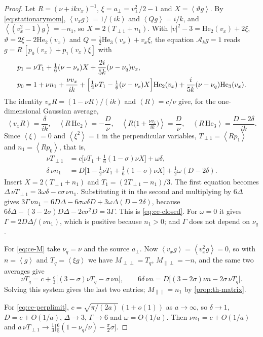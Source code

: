 \documentclass[11pt]{article}
\newcommand{\av}[1]{\left\langle #1\right\rangle}
\newcommand{\A}{\mathcal A}
\newcommand{\He}{\mathrm{He}}
\theoremstyle{definition}
\theoremstyle{remark}
\numberwithin{equation}{section}
\begin{document}
\begin{proof}
Let $R=(\nu+ikv_x)^{-1}$, $\xi=a_\perp=v_\perp^2/2-1$ and
$X=\av{\vartheta g}$. By \eqref{eq:stationarymom},
$\av{v_xg}=1/(ik)$ and $\av{Qg}=i/k$, and
$\av{(v_x^2-1)g}=-n_1$, so $X=2(T_{\perp1}+n_1)$. With
$|v|^2-3=\He_2(v_x)+2\xi$, $\vartheta=2\xi-2\He_2(v_x)$ and
$Q=\tfrac12\He_3(v_x)+v_x\xi$, the equation $\A_kg=1$ reads
$g=R\,[p_0(v_x)+p_1(v_x)\xi]$ with
\begin{align*}
 p_1&=\nu T_1+\tfrac16(\nu-\nu_s)X+\frac{2i}{5k}(\nu-\nu_q)v_x,\\
 p_0&=1+\nu n_1+\frac{\nu v_x}{ik}
     +\Bigl[\tfrac12\nu T_1-\tfrac16(\nu-\nu_s)X\Bigr]\He_2(v_x)
     +\frac{i}{5k}(\nu-\nu_q)\He_3(v_x).
\end{align*}
The identity $v_xR=(1-\nu R)/(ik)$ and $\av R=c/\nu$ give, for the
one-dimensional Gaussian average,
\[
 \av{v_xR}=\frac\delta{ik},\quad
 \av{R\,\He_2}=-\frac D\nu,\quad
 \av{R\bigl(1+\tfrac{\nu v_x}{ik}\bigr)}=\frac D\nu,\quad
 \av{R\,\He_3}=\frac{D-2\delta}{ik}.
\]
Since $\av\xi=0$ and $\av{\xi^2}=1$ in the perpendicular variables,
$T_{\perp1}=\av{Rp_1}$ and $n_1=\av{Rp_0}$, that is,
\begin{align*}
 \nu T_{\perp1}&=c\bigl[\nu T_1+\tfrac16(1-\sigma)\nu X\bigr]+\omega\delta,\\
 \delta\,\nu n_1&=D\bigl[1-\tfrac12\nu T_1+\tfrac16(1-\sigma)\nu X\bigr]
     +\tfrac12\omega(D-2\delta).
\end{align*}
Insert $X=2(T_{\perp1}+n_1)$ and $T_1=(2T_{\perp1}-n_1)/3$. The first
equation becomes $\Delta\,\nu T_{\perp1}=3\omega\delta-c\sigma\,\nu n_1$.
Substituting it in the second and multiplying by $6\Delta$ gives
$3\Gamma\,\nu n_1=6D\Delta-6\sigma\omega\delta D+3\omega\Delta(D-2\delta)$,
because
$6\delta\Delta-(3-2\sigma)D\Delta-2c\sigma^2D=3\Gamma$. This is
\eqref{eq:ce-closed}. For $\omega=0$ it gives
$\Gamma=2D\Delta/(\nu n_1)$, which is positive because $n_1>0$; and
$\Gamma$ does not depend on $\nu_q$.

For \eqref{eq:ce-M} take $\nu_q=\nu$ and the source $a_\perp$. Now
$\av{v_xg}=\av{v_x^2g}=0$, so with $n=\av g$ and $T_q=\av{\xi g}$ we have
$M_{\perp\perp}=T_q$, $M_{\parallel\perp}=-n$, and the same two averages
give
\[
 \nu T_q=c+\tfrac c3\bigl[(3-\sigma)\nu T_q-\sigma\,\nu n\bigr],\qquad
 6\delta\,\nu n=D\bigl[(3-2\sigma)\nu n-2\sigma\,\nu T_q\bigr].
\]
Solving this system gives the last two entries;
$M_{\parallel\parallel}=n_1$ by \cref{prop:th-matrix}.

For \eqref{eq:ce-perplimit}, $c=\sqrt{\pi/(2a)}\,(1+o(1))$ as
$a\to\infty$, so $\delta\to1$, $D=c+O(1/a)$, $\Delta\to3$,
$\Gamma\to6$ and $\omega=O(1/a)$. Then $\nu n_1=c+O(1/a)$ and
$a\,\nu T_{\perp1}\to\tfrac13\bigl[\tfrac65(1-\nu_q/\nu)
-\tfrac\pi2\sigma\bigr]$.
\end{proof}
\end{document}
